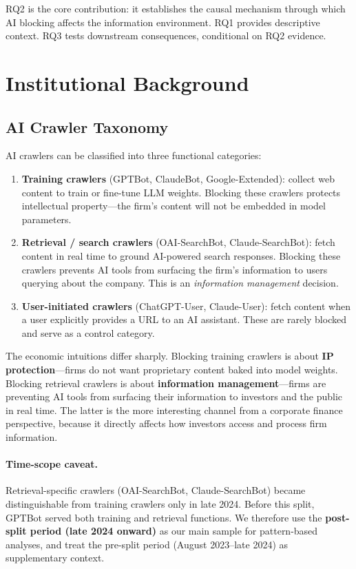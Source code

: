 \documentclass[12pt,a4paper]{article}
\begin{document}
\noindent RQ2 is the core contribution: it establishes the causal mechanism through which AI blocking affects the information environment. RQ1 provides descriptive context. RQ3 tests downstream consequences, conditional on RQ2 evidence.

\section{Institutional Background}

\subsection{AI Crawler Taxonomy}

AI crawlers can be classified into three functional categories:

\begin{enumerate}
    \item \textbf{Training crawlers} (GPTBot, ClaudeBot, Google-Extended): collect web content to train or fine-tune LLM weights. Blocking these crawlers protects intellectual property---the firm's content will not be embedded in model parameters.
    \item \textbf{Retrieval / search crawlers} (OAI-SearchBot, Claude-SearchBot): fetch content in real time to ground AI-powered search responses. Blocking these crawlers prevents AI tools from surfacing the firm's information to users querying about the company. This is an \emph{information management} decision.
    \item \textbf{User-initiated crawlers} (ChatGPT-User, Claude-User): fetch content when a user explicitly provides a URL to an AI assistant. These are rarely blocked and serve as a control category.
\end{enumerate}

\noindent The economic intuitions differ sharply. Blocking training crawlers is about \textbf{IP protection}---firms do not want proprietary content baked into model weights. Blocking retrieval crawlers is about \textbf{information management}---firms are preventing AI tools from surfacing their information to investors and the public in real time. The latter is the more interesting channel from a corporate finance perspective, because it directly affects how investors access and process firm information.

\paragraph{Time-scope caveat.} Retrieval-specific crawlers (OAI-SearchBot, Claude-SearchBot) became distinguishable from training crawlers only in late 2024. Before this split, GPTBot served both training and retrieval functions. We therefore use the \textbf{post-split period (late 2024 onward)} as our main sample for pattern-based analyses, and treat the pre-split period (August 2023--late 2024) as supplementary context.
\end{document}
